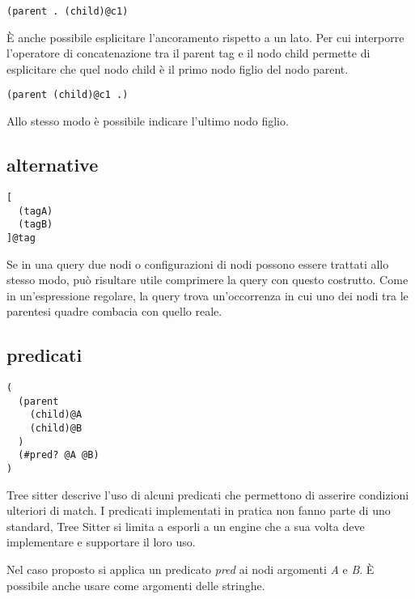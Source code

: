 \begin{lstlisting}
(parent . (child)@c1)
\end{lstlisting}

\`E anche possibile esplicitare l'ancoramento rispetto a un lato.
Per cui interporre l'operatore di concatenazione tra il parent tag e il nodo child permette di esplicitare che quel nodo child \`e il primo nodo figlio del nodo parent.

\begin{lstlisting}
(parent (child)@c1 .)
\end{lstlisting}

Allo stesso modo \`e possibile indicare l'ultimo nodo figlio.

\subsection{alternative}

\begin{lstlisting}
[
  (tagA)
  (tagB)
]@tag
\end{lstlisting}

Se in una query due nodi o configurazioni di nodi possono essere trattati allo stesso modo, pu\`o risultare utile comprimere la query con questo costrutto.
Come in un'espressione regolare, la query trova un'occorrenza in cui uno dei nodi tra le parentesi quadre combacia con quello reale.


\subsection{predicati}

\begin{lstlisting}
(
  (parent
    (child)@A
    (child)@B
  )
  (#pred? @A @B)
)
\end{lstlisting}

Tree sitter descrive l'uso di alcuni predicati che permettono di asserire condizioni ulteriori di match.
I predicati implementati in pratica non fanno parte di uno standard, Tree Sitter si limita a esporli a un engine che a sua volta deve implementare e supportare il loro uso.

Nel caso proposto si applica un predicato \emph{pred} ai nodi argomenti \emph{A} e \emph{B}.
\`E possibile anche usare come argomenti delle stringhe.
